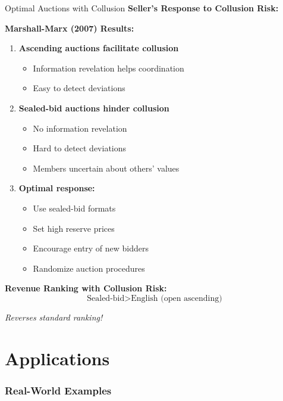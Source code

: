 \documentclass[xcolor={x11names}, aspectratio=169 ]{beamer}
\begin{document}
\begin{frame}{Optimal Auctions with Collusion}
\textbf{Seller's Response to Collusion Risk:}

\textbf{Marshall-Marx (2007) Results:}
\begin{enumerate}
  \item \textbf{Ascending auctions facilitate collusion}
  \begin{itemize}
    \item Information revelation helps coordination
    \item Easy to detect deviations
  \end{itemize}
  
  \item \textbf{Sealed-bid auctions hinder collusion}
  \begin{itemize}
    \item No information revelation
    \item Hard to detect deviations
    \item Members uncertain about others' values
  \end{itemize}
  
  \item \textbf{Optimal response:}
  \begin{itemize}
    \item Use sealed-bid formats
    \item Set high reserve prices
    \item Encourage entry of new bidders
    \item Randomize auction procedures
  \end{itemize}
\end{enumerate}

\textbf{Revenue Ranking with Collusion Risk:}
$$\text{Sealed-bid} > \text{English (open ascending)}$$

\textit{Reverses standard ranking!}
\end{frame}



\part{Applications}
\section{Real-World Examples}
\end{document}
